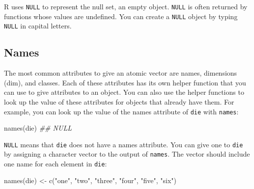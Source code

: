 \documentclass[
  letterpaper,
  DIV=11,
  numbers=noendperiod]{scrbook}
\newenvironment{Shaded}{\begin{snugshade}}{\end{snugshade}}
\newcommand{\DocumentationTok}[1]{\textcolor[rgb]{0.37,0.37,0.37}{\textit{#1}}}
\newcommand{\FunctionTok}[1]{\textcolor[rgb]{0.28,0.35,0.67}{#1}}
\newcommand{\NormalTok}[1]{\textcolor[rgb]{0.00,0.23,0.31}{#1}}
\newcommand{\OtherTok}[1]{\textcolor[rgb]{0.00,0.23,0.31}{#1}}
\newcommand{\StringTok}[1]{\textcolor[rgb]{0.13,0.47,0.30}{#1}}
\begin{document}
\begin{tcolorbox}[enhanced jigsaw, breakable, colback=white, colbacktitle=quarto-callout-tip-color!10!white, arc=.35mm, bottomrule=.15mm, coltitle=black, left=2mm, rightrule=.15mm, colframe=quarto-callout-tip-color-frame, leftrule=.75mm, opacitybacktitle=0.6, bottomtitle=1mm, toptitle=1mm, titlerule=0mm, opacityback=0, title=\textcolor{quarto-callout-tip-color}{\faLightbulb}\hspace{0.5em}{\texttt{NULL}}, toprule=.15mm]

R uses \texttt{NULL} to represent the null set, an empty object.
\texttt{NULL} is often returned by functions whose values are undefined.
You can create a \texttt{NULL} object by typing \texttt{NULL} in capital
letters.

\end{tcolorbox}

\subsection{Names}\label{sec-names}

The most common attributes to give an atomic vector are names,
dimensions (dim), and classes. Each of these attributes has its own
helper function that you can use to give attributes to an object. You
can also use the helper functions to look up the value of these
attributes for objects that already have them. For example, you can look
up the value of the names attribute of \texttt{die} with \texttt{names}:

\begin{Shaded}
\begin{Highlighting}[]
\FunctionTok{names}\NormalTok{(die)}
\DocumentationTok{\#\# NULL}
\end{Highlighting}
\end{Shaded}

\texttt{NULL} means that \texttt{die} does not have a names attribute.
You can give one to \texttt{die} by assigning a character vector to the
output of \texttt{names}. The vector should include one name for each
element in \texttt{die}:

\begin{Shaded}
\begin{Highlighting}[]
\FunctionTok{names}\NormalTok{(die) }\OtherTok{\textless{}{-}} \FunctionTok{c}\NormalTok{(}\StringTok{"one"}\NormalTok{, }\StringTok{"two"}\NormalTok{, }\StringTok{"three"}\NormalTok{, }\StringTok{"four"}\NormalTok{, }\StringTok{"five"}\NormalTok{, }\StringTok{"six"}\NormalTok{)}
\end{Highlighting}
\end{Shaded}
\end{document}
